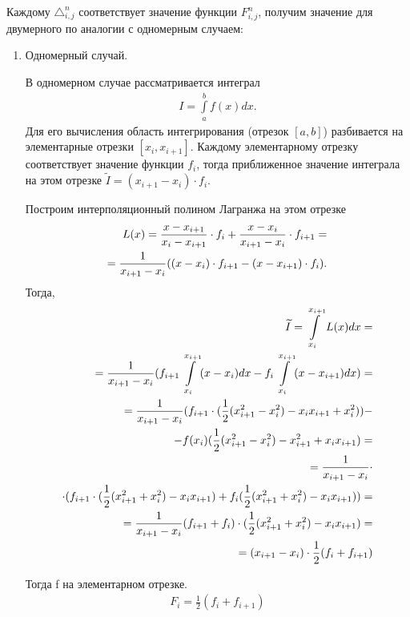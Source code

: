 \documentclass{article}
\begin{document}
Каждому $\triangle^n_{i,j}$ соответствует значение функции $F^n_{i,j}$, получим значение для двумерного по аналогии с одномерным случаем:

\begin{enumerate}
\item Одномерный случай.

В одномерном случае рассматривается интеграл
\begin{align}
I= \int\limits_a^b f(x) dx.
\end{align}
Для его вычисления область интегрирования (отрезок $[a,b]$) разбивается на элементарные отрезки $[x_i, x_{i+1}]$. Каждому элементарному отрезку соответствует значение функции $f_i$, тогда приближенное значение интеграла на этом отрезке $\widetilde{I}=(x_{i+1}-x_{i}) \cdot f_i$.

Построим интерполяционный полином Лагранжа на этом отрезке
\begin{align}
L(x) = \frac{x-x_{i+1}}{x_i-x_{i+1}} \cdot f_i+ \frac{x-x_i}{x_{i+1}-x_{i}} \cdot f_{i+1} = \notag \\
= \frac{1}{x_{i+1}-x_{i}} ((x-x_{i})\cdot f_{i+1}-(x-x_{i+1}) \cdot f_{i}).
\end{align}
Тогда,
\begin{align}
\widetilde{I} = \int\limits_{x_{i}}^{x_{i+1}} L(x) dx = \notag \\
= \frac{1}{x_{i+1}-x_{i}} (f_{i+1} \int\limits_{x_{i}}^{x_{i+1}} (x-x_{i}) dx - f_i \int\limits_{x_{i}}^{x_{i+1}} (x-x_{i+1}) dx) = \notag \\
= \frac{1}{x_{i+1}-x_{i}} (f_{i+1} \cdot (\frac{1}{2} (x_{i+1}^2 - x_{i}^2) -x_i x_{i+1}+x_{i}^2)) - \notag \\
- f(x_{i}) (\frac{1}{2} (x_{i+1}^2-x_{i}^2)-x_{i+1}^2+x_i x_{i+1}) = \notag \\
= \frac{1}{x_{i+1}-x_{i}} \cdot \notag \\
\cdot (f_{i+1} \cdot (\frac{1}{2} (x_{i+1}^2 + x_{i}^2) -x_i x_{i+1}) + f_i (\frac{1}{2}(x_{i+1}^2+x_{i}^2)-x_i x_{i+1})) = \notag \\
= \frac{1}{x_{i+1}-x_{i}} (f_{i+1}+ f_i) \cdot (\frac{1}{2} (x_{i+1}^2 + x_{i}^2) -x_i x_{i+1}) = \notag \\
= (x_{i+1}-x_{i}) \cdot \frac{1}{2}(f_i+f_{i+1})
\end{align}

Тогда f на элементарном отрезке.
\begin{align}
F_i = \frac{1}{2}(f_{i}+f_{i+1})
\end{align}


\end{enumerate}
\end{document}
